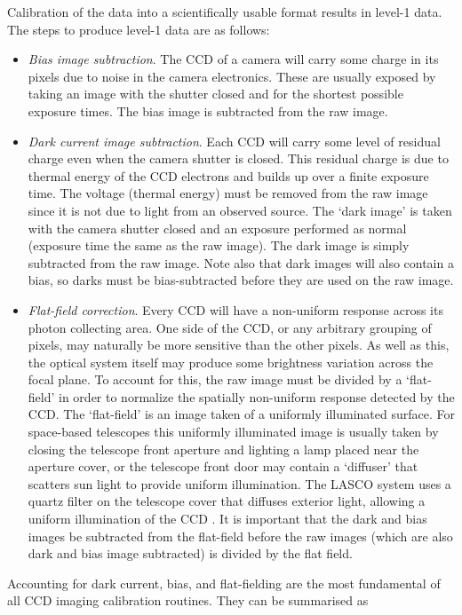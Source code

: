 Calibration of the data into a scientifically usable format results in level-1 data. The steps to produce level-1 data are as follows:
\begin{itemize}
\item \emph{Bias image subtraction}. The CCD of a camera will carry some charge in its pixels due to noise in the camera electronics. These are usually exposed by taking an image with the shutter closed and for the shortest possible exposure times. The bias image is subtracted from the raw image.
%
\item \emph{Dark current image subtraction}. Each CCD will carry some level of residual charge even when the camera shutter is closed. This residual charge is due to thermal energy of the CCD electrons and builds up over a finite exposure time. The voltage (thermal energy) must be removed from the raw image since it is not due to light from an observed source. The `dark image' is taken with the camera shutter closed and an exposure performed as normal (exposure time the same as the raw image). The dark image is simply subtracted from the raw image. Note also that dark images will also contain a bias, so darks must be bias-subtracted before they are used on the raw image.
%
%
\item \emph{Flat-field correction}. Every CCD will have a non-uniform response across its photon collecting area. One side of the CCD, or any arbitrary grouping of pixels, may naturally be more sensitive than the other pixels. As well as this, the optical system itself may produce some brightness variation across the focal plane. To account for this, the raw image must be divided by a `flat-field' in order to normalize the spatially non-uniform response detected by the CCD. The `flat-field' is an image taken of a uniformly illuminated surface. For space-based telescopes this uniformly illuminated image is usually taken by closing the telescope front aperture and lighting a lamp placed near the aperture cover, or the telescope front door may contain a `diffuser' that scatters sun light to provide uniform illumination. The LASCO system uses a quartz filter on the telescope cover that diffuses exterior light, allowing a uniform illumination of the CCD \citep{bru95}. It is important that the dark and bias images be subtracted from the flat-field before the raw images (which are also dark and bias image subtracted) is divided by the flat field.
%
\end{itemize}
Accounting for dark current, bias, and flat-fielding are the most fundamental of all CCD imaging calibration routines. They can be summarised as
